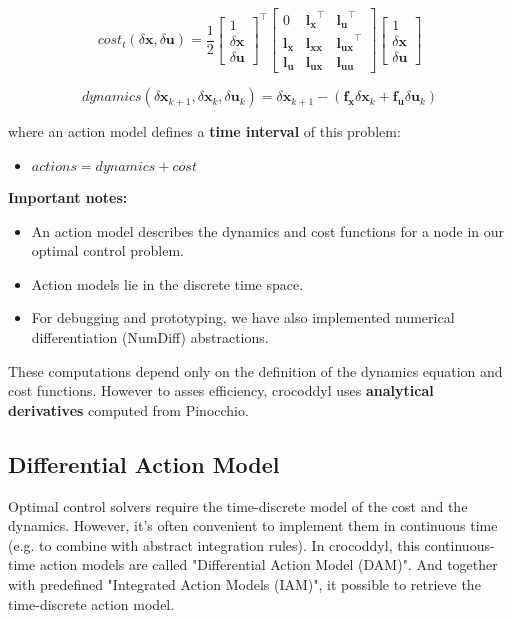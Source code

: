 $$cost_t(\delta\mathbf{x},\delta\mathbf{u}) = \frac{1}{2}
\begin{bmatrix} 
  1 \\ \delta\mathbf{x} \\ \delta\mathbf{u}
\end{bmatrix}^\top
\begin{bmatrix}
0 & \mathbf{l_x}^\top & \mathbf{l_u}^\top\\
\mathbf{l_x} & \mathbf{l_{xx}} & \mathbf{l_{ux}}^\top\\
\mathbf{l_u} & \mathbf{l_{ux}} & \mathbf{l_{uu}}
\end{bmatrix}
\begin{bmatrix}
  1 \\ \delta\mathbf{x} \\ \delta\mathbf{u}
\end{bmatrix}
$$

$$
dynamics(\delta\mathbf{x}_{k+1},\delta\mathbf{x}_k,\delta\mathbf{u}_k) = \delta\mathbf{x}_{k+1} - (\mathbf{f_x}\delta\mathbf{x}_k + \mathbf{f_u}\delta\mathbf{u}_k)
$$

where an action model defines a \textbf{time interval} of this problem:
\begin{itemize}
\item $actions = dynamics + cost$
\end{itemize}

\textbf{Important notes:}
\begin{itemize}
\item An action model describes the dynamics and cost functions for a node in our optimal control problem.
\item Action models lie in the discrete time space.
\item For debugging and prototyping, we have also implemented numerical differentiation (NumDiff) abstractions.
\end{itemize}
 These computations depend only on the definition of the dynamics equation and cost functions. However to asses efficiency, crocoddyl uses \textbf{analytical derivatives} computed from Pinocchio.
 
\subsection{Differential Action Model}
Optimal control solvers require the time-discrete model of the cost and the dynamics. However, it's often convenient to implement them in continuous time (e.g. to combine with abstract integration rules). In crocoddyl, this continuous-time action models are called "Differential Action Model (DAM)". And together with predefined "Integrated Action Models (IAM)", it possible to retrieve the time-discrete action model.


